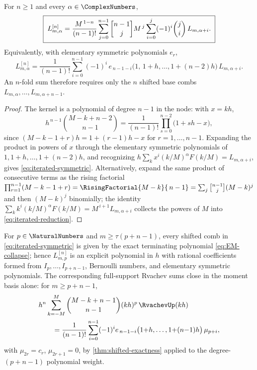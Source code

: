 \begin{theorem}
\label{thm:iterated-reduction}
For $n\ge1$ and every $\alpha\in\ComplexNumbers$,
\begin{equation}
 \boxed{\;
 L^{[n]}_{m,\alpha}
 =\frac{M^{\,1-n}}{(n-1)!}
 \sum_{j=0}^{n-1}\stirlingfirst{n-1}{j}M^{\,j}
 \sum_{i=0}^{j}(-1)^{i}\binom ji\,
 L_{m,\alpha+i}.
 \;}
 \label{eq:iterated-reduction}
\end{equation}
Equivalently, with elementary symmetric polynomials $e_r$,
\begin{equation}
 L^{[n]}_{m,\alpha}
 =\frac{1}{(n-1)!}
 \sum_{i=0}^{n-1}(-1)^{i}\,
 e_{\,n-1-i}\bigl(1,\,1{+}h,\dots,1{+}(n{-}2)h\bigr)\,
 L_{m,\alpha+i}.
 \label{eq:iterated-symmetric}
\end{equation}
An $n$-fold sum therefore requires only the $n$ shifted base combs
$L_{m,\alpha},\dots,L_{m,\alpha+n-1}$.
\end{theorem}

\begin{proof}
The kernel is a polynomial of degree $n-1$ in the node: with $x=kh$,
\[
 h^{\,n-1}\binom{M-k+n-2}{n-1}
 =\frac{1}{(n-1)!}\prod_{s=0}^{n-2}\bigl(1+sh-x\bigr),
\]
since $(M-k-1+r)h=1+(r-1)h-x$ for $r=1,\dots,n-1$.  Expanding the
product in powers of $x$ through the elementary symmetric polynomials
of $1,1{+}h,\dots,1{+}(n{-}2)h$, and recognizing
$h\sum_kx^{i}(k/M)^{\alpha}F(k/M)=L_{m,\alpha+i}$, gives
\eqref{eq:iterated-symmetric}.  Alternatively, expand the same product
of consecutive terms as the rising factorial
$\prod_{r=1}^{n-1}(M-k-1+r)=\RisingFactorial{M-k}{\,n-1}
=\sum_{j}\stirlingfirst{n-1}{j}(M-k)^{j}$ and then $(M-k)^{j}$
binomially; the identity
$\sum_kk^{i}(k/M)^{\alpha}F(k/M)=M^{\,i+1}L_{m,\alpha+i}$ collects
the powers of $M$ into \eqref{eq:iterated-reduction}.
\end{proof}

\begin{corollary}
\label{cor:iterated-natural}
For $p\in\NaturalNumbers$ and $m\ge\tau(p+n-1)$, every shifted comb in
\eqref{eq:iterated-symmetric} is given by the exact terminating
polynomial \eqref{eq:EM-collapse}; hence $L^{[n]}_{m,p}$ is an
explicit polynomial in $h$ with rational coefficients formed from
$I_p,\dots,I_{p+n-1}$, Bernoulli numbers, and elementary symmetric
polynomials.  The corresponding full-support Rvachev sums close in
the moment basis alone: for $m\ge p+n-1$,
\begin{equation}
  \begin{aligned}
  &h^{n}\sum_{k=-M}^{M}\binom{M-k+n-1}{n-1}
    (kh)^{p}\,\RvachevUp(kh)\\
 &\qquad=\frac{1}{(n-1)!}
    \sum_{i=0}^{n-1}(-1)^{i}
    e_{\,n-1-i}\bigl(1{+}h,\dots,1{+}(n{-}1)h\bigr)\,\mu_{p+i},
  \end{aligned}
 \label{eq:iter-up-moments}
\end{equation}
with $\mu_{2r}=c_r$, $\mu_{2r+1}=0$, by
\cref{thm:shifted-exactness} applied to the degree-$(p{+}n{-}1)$
polynomial weight.
\end{corollary}

